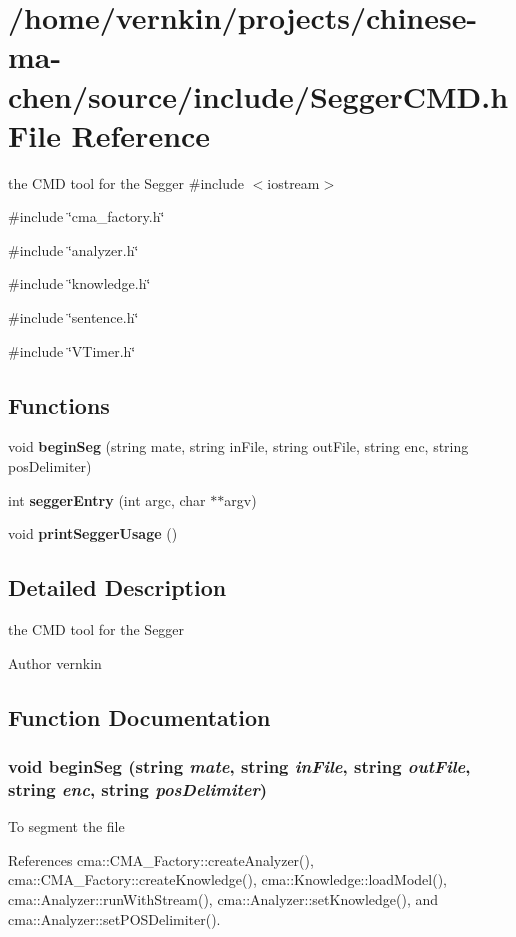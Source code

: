 \section{/home/vernkin/projects/chinese-\/ma-\/chen/source/include/SeggerCMD.h File Reference}
\label{SeggerCMD_8h}


the CMD tool for the Segger  
{\ttfamily \#include $<$iostream$>$}\par
{\ttfamily \#include \char`\"{}cma\_\-factory.h\char`\"{}}\par
{\ttfamily \#include \char`\"{}analyzer.h\char`\"{}}\par
{\ttfamily \#include \char`\"{}knowledge.h\char`\"{}}\par
{\ttfamily \#include \char`\"{}sentence.h\char`\"{}}\par
{\ttfamily \#include \char`\"{}VTimer.h\char`\"{}}\par
\subsection*{Functions}
\begin{DoxyCompactItemize}
\item 
void {\bf beginSeg} (string mate, string inFile, string outFile, string enc, string posDelimiter)
\item 
int {\bfseries seggerEntry} (int argc, char $\ast$$\ast$argv)\label{SeggerCMD_8h_ae624a37c8cde5a86c57acff2b8e2b15a}

\item 
void {\bfseries printSeggerUsage} ()\label{SeggerCMD_8h_a7c87e8750f51eca3e1b15b7f252d5131}

\end{DoxyCompactItemize}


\subsection{Detailed Description}
the CMD tool for the Segger \begin{DoxyAuthor}{Author}
vernkin 
\end{DoxyAuthor}


\subsection{Function Documentation}
\subsubsection[{beginSeg}]{\setlength{\rightskip}{0pt plus 5cm}void beginSeg (string {\em mate}, \/  string {\em inFile}, \/  string {\em outFile}, \/  string {\em enc}, \/  string {\em posDelimiter})}\label{SeggerCMD_8h_ab30a0cc7bae3e3976cb797d3f026c20b}
To segment the file 

References cma::CMA\_\-Factory::createAnalyzer(), cma::CMA\_\-Factory::createKnowledge(), cma::Knowledge::loadModel(), cma::Analyzer::runWithStream(), cma::Analyzer::setKnowledge(), and cma::Analyzer::setPOSDelimiter().